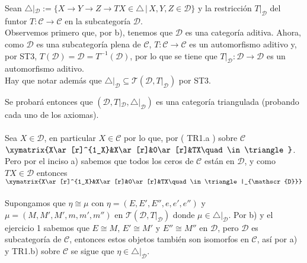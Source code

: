  Sean $\triangle|_{\mathscr{D}}:=\{X\to Y\to Z\to TX\in \triangle\,|\, X,Y,Z\in \mathscr{D}\}$ y la restricción $T|_{\mathscr{D}}$ del
funtor $T:\mathscr{C}\longrightarrow \mathscr{C}$ en la subcategoría $\mathscr{D}$.\\

Observemos primero que, por b), tenemos que $\mathscr{D}$ es una categoría aditiva. Ahora, como $\mathscr{D}$ es una subcategoría plena de 
$\mathscr{C}$, $T:\mathscr{C}\to \mathscr{C}$ es un automorfismo aditivo y, por ST3, $T(\mathscr{D})=\mathscr{D}=T^{-1}(\mathscr{D})$,
por lo que se tiene que $T|_{\mathscr{D}}:\mathscr{D}\to \mathscr{D}$ es un automorfismo aditivo.\\
Hay que notar además que $\triangle|_{\mathscr{D}}\subseteq \mathcal{T}(\mathscr{D},T|_{\mathscr{D}})$ por ST3.

Se probará entonces que $(\mathscr{D},T|_{\mathscr{D}},\triangle|_{\mathscr{D}})$ es una categoría triangulada (probando cada uno de los axiomas).\\

\\
Sea $X\in \mathscr{D}$, en particular  $X\in \mathscr{C}$ por lo que, por ( TR1.a ) sobre $\mathscr{C}$
\\$\xymatrix{X\ar[r]^{1_X}&X\ar[r]&0\ar[r]&TX\quad\in \triangle}$.
Pero por el inciso a) sabemos que todos los ceros de $\mathscr{C}$ están en $\mathscr{D}$, y como $TX\in \mathscr{D}$  entonces \\
$\xymatrix{X\ar[r]^{1_X}&X\ar[r]&0\ar[r]&TX\quad\in \triangle|_{\mathscr{D}}}$\\

\\

Supongamos que $\eta\cong \mu$ con $\eta=(E,E',E'',e,e',e'')$ y $\mu=(M,M',M',m,m',m'')$ en $\mathcal{T}(\mathscr{D},T|_{\mathscr{D}})$ donde
$\mu\in \triangle|_{\mathscr{D}}$. Por b) y el ejercicio 1 sabemos que $E\cong M$, $E'\cong M'$ y $E''\cong M''$ en $\mathscr{D}$, pero 
$\mathscr{D}$ es subcategoría de $\mathscr{C}$, entonces estos objetos también son isomorfos en $\mathscr{C}$, así por a) y TR1.b) sobre 
$\mathscr{C}$ se sigue que $\eta\in \triangle|_{\mathscr{D}}$.